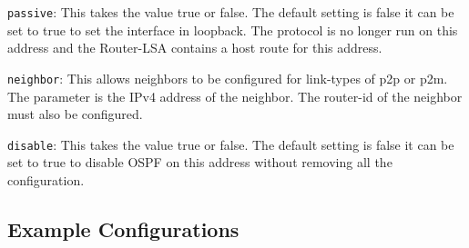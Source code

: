 \begin{description}
\begin{description}
\begin{description}
\begin{description}
\begin{description}
\begin{description}
\item{\tt passive}: This takes the value {\stt true} or {\stt
false}. The default setting is {\stt false} it can be set to {\stt
true} to set the interface in loopback. The protocol is no longer run
on this address and the Router-LSA contains a host route for this address.
\item{\tt neighbor}: This allows neighbors to be configured for {\stt
link-type}s of {\stt p2p} or {\stt p2m}. The parameter is the IPv4
address of the neighbor. The {\stt router-id} of the neighbor must
also be configured.
\item{\tt disable}:  This takes the value {\stt true} or {\stt
false}. The default setting is {\stt false} it can be set to {\stt
true} to disable OSPF on this address without removing all the configuration.
\end{description}
\end{description}
\end{description}
\end{description}

\end{description}
\end{description}

\subsection{Example Configurations}

\vspace{0.1in}
\noindent{}

